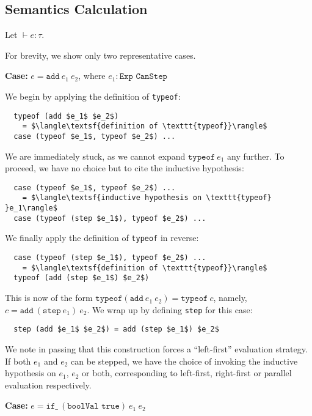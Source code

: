 \documentclass[manuscript,screen,sigplan]{acmart}
\begin{document}
\subsection{Semantics Calculation}

Let $\vdash e : \tau$.

For brevity, we show only two representative cases.

\textbf{Case:} $e = \texttt{add}\ e_1\ e_2$, where $e_1 : \texttt{Exp CanStep}$

We begin by applying the definition of \texttt{typeof}:

\begin{lstlisting}
  typeof (add $e_1$ $e_2$)
    = $\langle\textsf{definition of \texttt{typeof}}\rangle$
  case (typeof $e_1$, typeof $e_2$) ...
\end{lstlisting}

We are immediately stuck, as we cannot expand $\texttt{typeof}\ e_1$ any
further. To proceed, we have no choice but to cite the inductive hypothesis:

\begin{lstlisting}
  case (typeof $e_1$, typeof $e_2$) ...
    = $\langle\textsf{inductive hypothesis on \texttt{typeof} }e_1\rangle$
  case (typeof (step $e_1$), typeof $e_2$) ...
\end{lstlisting}

We finally apply the definition of \texttt{typeof} in reverse:

\begin{lstlisting}
  case (typeof (step $e_1$), typeof $e_2$) ...
    = $\langle\textsf{definition of \texttt{typeof}}\rangle$
  typeof (add (step $e_1$) $e_2$)
\end{lstlisting}

This is now of the form $\texttt{typeof} (\texttt{add}\ e_1\ e_2) = \texttt{typeof}\ c$,
namely, $c = \texttt{add}\ (\texttt{step}\ e_1)\ e_2$. We wrap up by defining
\texttt{step} for this case:

\begin{lstlisting}
  step (add $e_1$ $e_2$) = add (step $e_1$) $e_2$
\end{lstlisting}

We note in passing that this construction forces a ``left-first'' evaluation
strategy. If both $e_1$ and $e_2$ can be stepped, we have the choice of
invoking the inductive hypothesis on $e_1$, $e_2$ or both, corresponding to
left-first, right-first or parallel evaluation respectively.

\textbf{Case:} $e = \texttt{if\_}\ (\texttt{boolVal true})\ e_1\ e_2$
\end{document}
